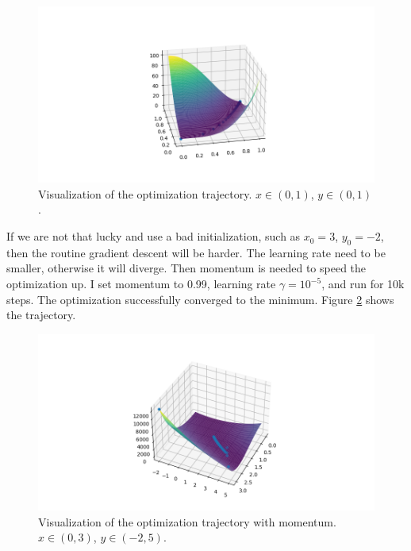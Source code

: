 \begin{figure}[h]
    \includegraphics[width=.8\textwidth]{./routine_gd.png}
    \caption{Visualization of the optimization trajectory. $x \in (0,1)$, $y \in (0,1)$.}
    \label{fig:routine_gd}
\end{figure}

If we are not that lucky and use a bad initialization, such as $x_0 = 3$, $y_0 = -2$,
then the routine gradient descent will be harder.
The learning rate need to be smaller, otherwise it will diverge.
Then momentum is needed to speed the optimization up.
I set momentum to 0.99, learning rate $\gamma=10^{-5}$, and run for 10k steps.
The optimization successfully converged to the minimum.
Figure \ref{fig:gd_m} shows the trajectory.

\begin{figure}[h]
    \includegraphics[width=.8\textwidth]{./gd_m.png}
    \caption{Visualization of the optimization trajectory with momentum. $x \in (0,3)$, $y \in (-2,5)$.}
    \label{fig:gd_m}
\end{figure}

\section{}


